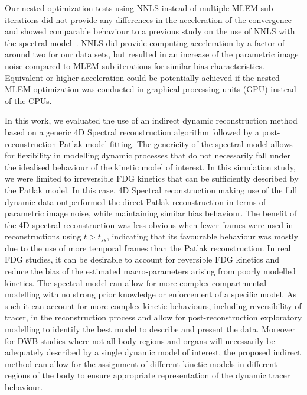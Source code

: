 Our nested optimization tests using NNLS instead of multiple MLEM sub-iterations did not provide any differences in the acceleration of the convergence and showed comparable behaviour to a previous study on the use of NNLS with the spectral model~\cite{Matthews2010}. 
NNLS did provide computing acceleration by a factor of around two for our data sets, but resulted in an increase of the parametric image noise compared to MLEM sub-iterations for similar bias characteristics.
Equivalent or higher acceleration could be potentially achieved if the nested MLEM optimization was conducted in graphical processing units (GPU) instead of the CPUs.

In this work, we evaluated the use of an indirect dynamic reconstruction method based on a generic 4D Spectral reconstruction algorithm followed by a post-reconstruction Patlak model fitting. 
The genericity of the spectral model allows for flexibility in modelling dynamic processes that do not necessarily fall under the idealised behaviour of the kinetic model of interest.
In this simulation study, we were limited to irreversible FDG kinetics that can be sufficiently described by the Patlak model. 
In this case, 4D Spectral reconstruction making use of the full dynamic data outperformed the direct Patlak reconstruction in terms of parametric image noise, while maintaining similar bias behaviour. 
The benefit of the 4D spectral reconstruction was less obvious when fewer frames were used in reconstructions using $t>t_{ss}$, indicating that its favourable behaviour was mostly due to the use of more temporal frames than the Patlak reconstruction.
In real FDG studies, it can be desirable to account for reversible FDG kinetics and reduce the bias of the estimated macro-parameters arising from poorly modelled kinetics. 
The spectral model can allow for more complex compartmental modelling with no strong prior knowledge or enforcement of a specific model. 
As such it can account for more complex kinetic behaviours, including reversibility of tracer, in the reconstruction process 
and allow for post-reconstruction exploratory modelling to identify the best model to describe and present the data. 
Moreover for DWB studies where not all body regions and organs will necessarily be adequately described by a single dynamic model of interest, 
the proposed indirect method can allow for the assignment of different kinetic models in different regions of the body to ensure appropriate representation of the dynamic tracer behaviour.
